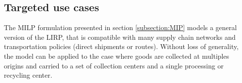 \documentclass[a4paper,10pt]{article}
\begin{document}
\begin{linenumbers}


\subsection{Targeted use cases}

The MILP formulation presented in section \ref{subsection:MIP} models a general version of the LIRP, 
that is compatible with many supply chain networks and transportation policies (direct shipments or routes). 
Without loss of generality, the model can be applied to the case where goods are collected at multiples origins and carried to a set of collection centers and a single processing or recycling center. 


\end{linenumbers}
\end{document}
